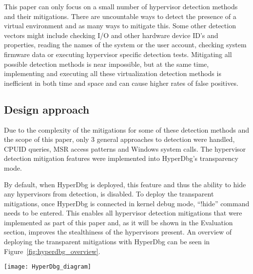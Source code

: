 This paper can only focus on a small number of hypervisor detection methods and their mitigations. There are uncountable ways to detect the presence of a virtual environment and as many ways to mitigate this.
Some other detection vectors might include checking I/O and other hardware device ID's and properties, reading the names of the system or the user account, checking system firmware data or executing hypervisor specific detection tests.
Mitigating all possible detection methods is near impossible, but at the same time, implementing and executing all these virtualization detection methods is inefficient in both time and space and can cause higher rates of false positives.


\subsection{Design approach}
Due to the complexity of the mitigations for some of these detection methods and the scope of this paper, only 3 general approaches to detection were handled, CPUID queries, MSR access patterns and Windows system calls. 
The hypervisor detection mitigation features were implemented into HyperDbg's transparency mode. 

By default, when HyperDbg is deployed, this feature and thus the ability to hide any hypervisors from detection, is disabled. To deploy the transparent mitigations, 
once HyperDbg is connected in kernel debug mode, “!hide” command needs to be entered. This enables all hypervisor detection mitigations that were implemented as part of this paper and, 
as it will be shown in the Evaluation section, improves the stealthiness of the hypervisors present. An overview of deploying the transparent mitigations with HyperDbg can be seen in Figure~\ref{fig:hyperdbg_overview}.

\begin{figure*}[t]
    \texttt{[image: HyperDbg\_diagram]} %
    \label{fig:hyperdbg_overview}
\end{figure*}


